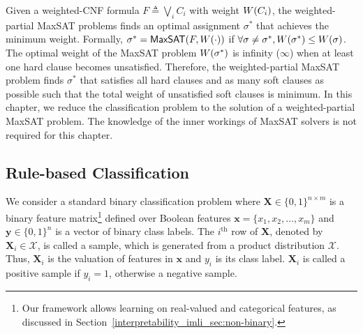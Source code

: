 Given a weighted-CNF formula $F \triangleq \bigvee_i C_i$ with weight $ W \! \left( C_i \right) $, the weighted-partial MaxSAT problems finds an optimal assignment $\sigma^*$ that achieves the minimum weight. Formally,  $\sigma^* = \mathsf{MaxSAT}(F,W \! \left( \cdot \right))$ if $\forall \sigma \neq \sigma^*, W \! \left( \sigma^* \right) \leq W \! \left( \sigma \right)$. The optimal weight of the MaxSAT problem $  W \! \left( \sigma^* \right) $ is infinity ($ \infty $) when at least one hard clause becomes unsatisfied.  Therefore,  the weighted-partial MaxSAT problem finds $ \sigma^* $ that satisfies all hard clauses and as many soft clauses as possible such that the total weight of unsatisfied soft clauses is minimum. In this chapter, we reduce the classification problem  to the solution of a weighted-partial MaxSAT problem. The knowledge of the inner workings of {MaxSAT} solvers is  not required for this chapter.  

%


\subsection*{Rule-based Classification}

We consider a standard binary classification problem where $ \mathbf{X} \in \{0,1\}^{n\times m} $ is a binary feature matrix\footnote{Our framework allows learning on real-valued and categorical features, as discussed in Section~\ref{interpretability_imli_sec:non-binary}.} defined over Boolean features $\mathbf{x} = \{x_1, x_2, \dots, x_m\}$ and $ \mathbf{y} \in \{0,1\}^n $ is a vector of binary class labels.  The $ i^\text{th} $ row of $ \mathbf{X} $, denoted by $ \mathbf{X}_i \in \mathcal{X} $, is called a sample, which is generated from a product distribution $ \mathcal{X} $. Thus, $ \mathbf{X}_i $ is the valuation of features in $ \mathbf{x} $ and $ y_i $ is its class label.  $ \mathbf{X}_i $ is called a positive sample if $ y_i = 1 $, otherwise a negative sample.


